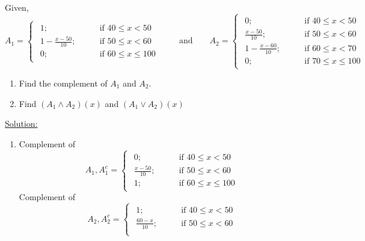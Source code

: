 \documentclass[../main-sheet.tex]{subfiles}
\begin{document}
\begin{ex}
    Given,
    \[
        A_1=\begin{cases}
            \begin{aligned}
                1; \qquad&\text{if }40\leq x<50\\
                1-\frac{x-50}{10}; \qquad&\text{if }50\leq x<60\\
                0; \qquad&\text{if }60\leq x\leq 100
            \end{aligned}
    \end{cases}
    \qquad\text{and}\qquad
    A_2=\begin{cases}
        \begin{aligned}
            0; \qquad&\text{if }40\leq x<50\\
            \frac{x-50}{10}; \qquad&\text{if }50\leq x<60\\
            1-\frac{x-60}{10}; \qquad&\text{if }60\leq x<70\\
            0; \qquad&\text{if }70\leq x\leq 100
        \end{aligned}
    \end{cases}
    \]
    \begin{enumerate}
        \item Find the complement of \(A_1\) and \(A_2\).
        \item Find \((A_1\wedge A_2)(x)\) and \((A_1\vee A_2)(x)\)
    \end{enumerate}
    \underline{Solution:}
    \begin{enumerate}
        \item Complement of 
        \[
            A_1, A_1^c=\begin{cases}
                \begin{aligned}
                    0; \qquad&\text{if }40\leq x<50\\
                    \frac{x-50}{10}; \qquad&\text{if }50\leq x<60\\
                    1; \qquad&\text{if }60\leq x\leq 100
                \end{aligned}
            \end{cases}
            \]
        Complement of 
        \[
            A_2, A_2^c=\begin{cases}
                \begin{aligned}
                    1; \qquad&\text{if }40\leq x<50\\
                    \frac{60-x}{10}; \qquad&\text{if }50\leq x<60\\

\end{aligned}
\end{cases}\]
\end{enumerate}
\end{ex}
\end{document}
